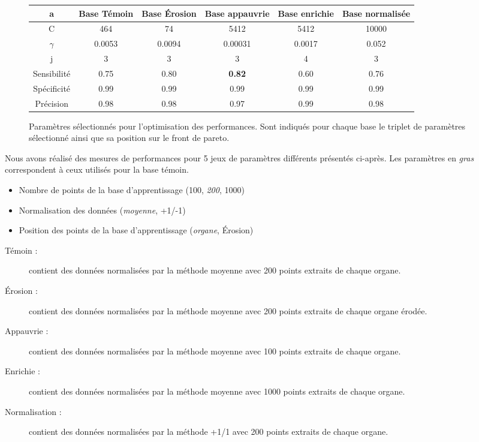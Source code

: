 \begin{figure}[h!]
\label{fig:paramsParams}
		\begin{tabular}{c c c c c c}
  \hline
  a	& Base Témoin 	& Base Érosion	& Base appauvrie& Base enrichie & Base normalisée \\
  \hline
 C 	& 464		& 74		& 5412		& 5412		& 10000 \\
\hline
$\gamma$& 0.0053	& 0.0094	& 0.00031	& 0.0017	& 0.052 \\
\hline
j	& 3		& 3		& 3		& 4		& 3	\\
\hline
\hline
Sensibilité& 0.75	& 0.80		& \textbf{0.82}		& 0.60		& 0.76	\\
\hline
Spécificité& 0.99	& 0.99		& 0.99		& 0.99		& 0.99 \\
\hline
Précision& 0.98		& 0.98		& 0.97		& 0.99		& 0.98 \\
\hline
 		\end{tabular}

\caption{Paramètres sélectionnés pour l'optimisation des performances. Sont indiqués pour chaque base le triplet de paramètres sélectionné ainsi que sa position sur le front de pareto.}
\end{figure}






Nous avons réalisé des mesures de performances pour 5 jeux de paramètres différents présentés ci-après. Les paramètres en \emph{gras} correspondent à ceux utilisés pour la base témoin.

\begin{itemize}
 \item Nombre de points de la base d'apprentissage (100, \emph{200}, 1000)
 \item Normalisation des données (\emph{moyenne}, +1/-1)
 \item Position des points de la base d'apprentissage (\emph{organe}, Érosion)
\end{itemize}


\begin{description}
 \item[Témoin : ] contient des données normalisées par la méthode moyenne avec 200 points extraits de chaque organe.
 \item[\'Erosion : ] contient des données normalisées par la méthode moyenne avec 200 points extraits de chaque organe érodée.
 \item[Appauvrie : ] contient des données normalisées par la méthode moyenne avec 100 points extraits de chaque organe.
 \item[Enrichie : ] contient des données normalisées par la méthode moyenne avec 1000 points extraits de chaque organe.
 \item[Normalisation : ] contient des données normalisées par la méthode +1/1 avec 200 points extraits de chaque organe.
\end{description}


